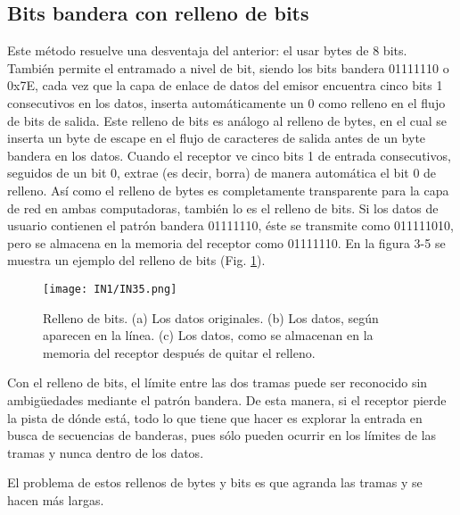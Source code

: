 \documentclass[
	12pt, %
	fleqn, %
	a4paper, %
	oneside, %
]{LegrandOrangeBook}
\begin{document}
\subsection{Bits bandera con relleno de bits}
Este método resuelve una desventaja del anterior: el usar bytes de 8 bits. También permite el entramado a nivel de bit, siendo los bits bandera 01111110 o 0x7E, cada vez que la capa de enlace de datos del emisor encuentra cinco bits 1 consecutivos en los datos, inserta automáticamente un 0 como relleno en el flujo de bits de salida. Este relleno de bits es análogo al relleno de bytes, en el cual se inserta un byte de escape en el flujo de caracteres de salida antes de un byte bandera en los datos. Cuando el receptor ve cinco bits 1 de entrada consecutivos, seguidos de un bit 0, extrae (es decir, borra) de manera automática el bit 0 de relleno. Así como el relleno de bytes es completamente transparente para la capa de red en ambas computadoras, también lo es el relleno de bits. Si los datos de usuario contienen el patrón bandera 01111110, éste se transmite como 011111010, pero se almacena en la memoria del receptor como 01111110. En la figura 3-5 se muestra un ejemplo del relleno de bits (Fig. \ref{fig: bandera bits}).
\begin{figure}[]
\centering
\texttt{[image: IN1/IN35.png]}
\caption{Relleno de bits. (a) Los datos originales. (b) Los datos, según aparecen en la línea. (c) Los datos, como se almacenan en la memoria del receptor después de quitar el relleno.}
\label{fig: bandera bits}
\end{figure}
Con el relleno de bits, el límite entre las dos tramas puede ser reconocido sin ambigüedades mediante el patrón bandera. De esta manera, si el receptor pierde la pista de dónde está, todo lo que tiene que hacer es explorar la entrada en busca de secuencias de banderas, pues sólo pueden ocurrir en los límites de las
tramas y nunca dentro de los datos.
\begin{remark}
El problema de estos rellenos de bytes y bits es que agranda las tramas y se hacen más largas.
\end{remark}
\end{document}
